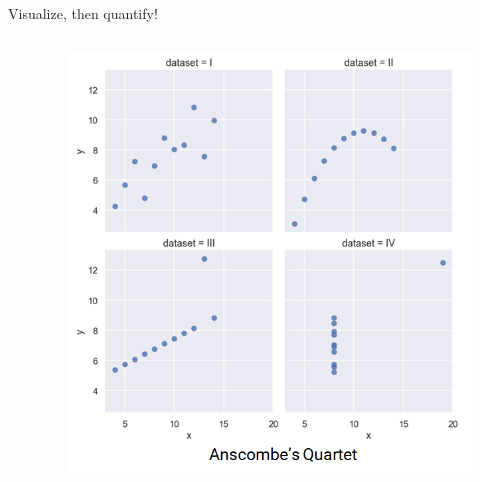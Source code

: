 \documentclass[aspectratio=169]{../latex_main/tntbeamer}  %
\begin{document}
\begin{frame}{Visualize, then quantify!}
\begin{columns}
\begin{column}{.6\textwidth}
	     \end{column}
	    \begin{column}{.4\textwidth}
	        \begin{figure}
	            \centering
        	    \includegraphics[scale=.34]{Bild8}
	        \end{figure}
        	    
	    
	    \end{column}
	    \end{columns}
	\end{frame}
	
	
	
\end{document}

